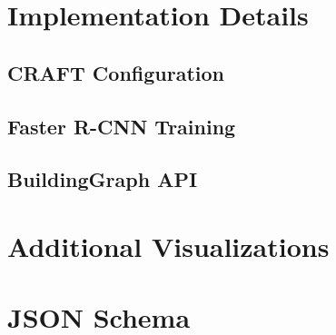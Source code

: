 \documentclass[manuscript,screen,review]{acmart}
\begin{document}
\section{Implementation Details}
\label{app:implementation}

\subsection{CRAFT Configuration}

\subsection{Faster R-CNN Training}

\subsection{BuildingGraph API}

\section{Additional Visualizations}
\label{app:visualizations}


\section{JSON Schema}
\label{app:schema}

\end{document}
